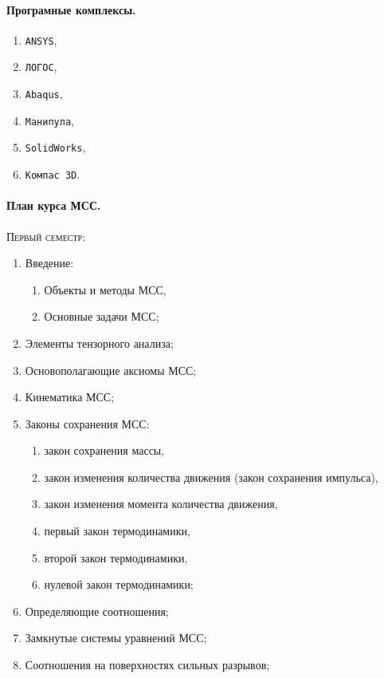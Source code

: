 \paragraph{Програмные комплексы.}
\begin{enumerate}
	\item \texttt{ANSYS},
	\item \texttt{ЛОГОС},
	\item \texttt{Abaqus},
	\item \texttt{Манипула},
	\item \texttt{SolidWorks},
	\item \texttt{Компас 3D}.
\end{enumerate}

\paragraph{План курса МСС.} \textsc{Первый семестр}:
\begin{enumerate}
  \item Введение:
    \begin{enumerate}
      \item Объекты и методы МСС,
      \item Основные задачи МСС;
    \end{enumerate}
  \item Элементы тензорного анализа;
  \item Основополагающие аксиомы МСС;
  \item Кинематика МСС;
  \item Законы сохранения МСС:
    \begin{enumerate}
      \item закон сохранения массы,
      \item закон изменения количества движения (закон сохранения импульса),
      \item закон изменения момента количества движения,
      \item первый закон термодинамики,
      \item второй закон термодинамики,
      \item нулевой закон термодинамики;
    \end{enumerate}
  \item Определяющие соотношения;
  \item Замкнутые системы уравнений МСС;
  \item Соотношения на поверхностях сильных разрывов;
\end{enumerate}

